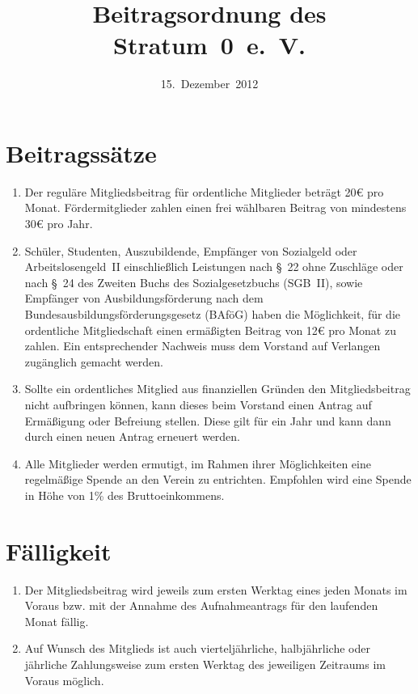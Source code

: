 \documentclass[a4paper,12pt]{scrartcl}
\title{Beitragsordnung des Stratum~0~e.~V.}
\date{15.~Dezember~2012}
\begin{document}
\maketitle

\section{Beitragssätze}
\begin{enumerate}
  \item Der reguläre Mitgliedsbeitrag für ordentliche Mitglieder beträgt 20€
    pro Monat. Fördermitglieder zahlen einen frei wählbaren Beitrag von
    mindestens 30€ pro Jahr.
  \item Schüler, Studenten, Auszubildende, Empfänger von Sozialgeld oder
    Arbeitslosengeld~II
    einschließlich Leistungen nach §~22 ohne Zuschläge oder nach §~24 des
    Zweiten Buchs des Sozialgesetzbuchs (SGB~II), sowie Empfänger von
    Ausbildungsförderung nach dem Bundesausbildungsförderungsgesetz (BAföG)
    haben die Möglichkeit, für die ordentliche Mitgliedschaft einen ermäßigten
    Beitrag von 12€ pro Monat zu
    zahlen. Ein entsprechender Nachweis muss dem Vorstand auf Verlangen
    zugänglich gemacht werden.
  \item Sollte ein ordentliches Mitglied aus finanziellen Gründen den
    Mitgliedsbeitrag nicht
    aufbringen können, kann dieses beim Vorstand einen Antrag auf Ermäßigung
    oder Befreiung stellen. Diese gilt für ein Jahr und kann dann durch einen
    neuen Antrag erneuert werden.
  \item Alle Mitglieder werden ermutigt, im Rahmen ihrer Möglichkeiten eine
    regelmäßige Spende an den Verein zu entrichten. Empfohlen wird eine Spende
    in Höhe von 1\% des Bruttoeinkommens.
\end{enumerate}

\section{Fälligkeit}
\begin{enumerate}
  \item Der Mitgliedsbeitrag wird jeweils zum ersten Werktag eines jeden Monats
    im Voraus bzw. mit der Annahme des Aufnahmeantrags für den laufenden Monat
    fällig.
  \item Auf Wunsch des Mitglieds ist auch vierteljährliche, halbjährliche oder
    jährliche Zahlungsweise zum ersten Werktag des jeweiligen Zeitraums im
    Voraus möglich.
\end{enumerate}
\end{document}
